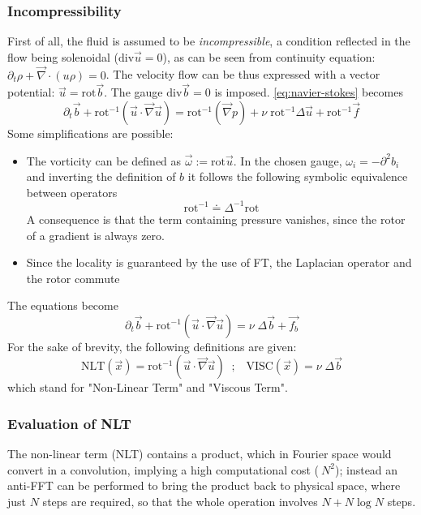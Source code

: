 \subsubsection{Incompressibility}
First of all, the fluid is assumed to be \textit{incompressible}, a condition reflected in the flow being solenoidal (\(\mathrm{div} \vec{u} = 0\)), as can be seen from continuity equation: \(\partial_t \rho + \vec{\nabla} \cdot(u\rho) =0 \).
The velocity flow can be thus expressed with a vector potential: \( \vec{u} = \mathrm{rot} \vec{b} \). The gauge \(\mathrm{div} \vec{b} = 0 \) is imposed. 
\autoref{eq:navier-stokes} becomes
\begin{equation} \label{eq:ns-vecpot-pre}
  \partial_t \vec{b} + \mathrm{rot}^{-1} (\vec{u}\cdot\vec{\nabla}\vec{u}) = \mathrm{rot}^{-1} (\vec{\nabla}p) +\nu\;\mathrm{rot}^{-1}\Delta\vec{u} + \mathrm{rot}^{-1} \vec{f}
\end{equation}
Some simplifications are possible:
\begin{itemize}
  \item The vorticity can be defined as \( \vec{\omega} := \mathrm{rot} \vec{u}\). In the chosen gauge, \( \omega_i = -\partial^2 b_i \) and inverting the definition of $b$ it follows the following symbolic equivalence between operators 
    \[ \mathrm{rot}^{-1} \doteq \Delta^{-1} \mathrm{rot} \]
    A consequence is that the term containing pressure vanishes, since the rotor of a gradient is always zero.
  \item Since the locality is guaranteed by the use of FT, the Laplacian operator and the rotor commute
\end{itemize}
The equations become
\begin{equation} \label{eq:ns-vecpot}
  \partial_t \vec{b} + \mathrm{rot}^{-1} (\vec{u}\cdot\vec{\nabla}\vec{u}) = \nu\;\Delta\vec{b} + \vec{f_b}
\end{equation}
For the sake of brevity, the following definitions are given:
\[ \mathrm{NLT}(\vec{x}) = \mathrm{rot}^{-1}
(\vec{u}\cdot\vec{\nabla}\vec{u}) \;\;;\;\;\; 
\mathrm{VISC}(\vec{x}) = \nu\;\Delta\vec{b} \]
which stand for "Non-Linear Term" and "Viscous Term".

\subsubsection{Evaluation of NLT}
The non-linear term (NLT) contains a product, which in Fourier space would convert in a convolution, implying a high computational cost ($~N^2$); instead an anti-FFT can be performed to bring the product back to physical space, where just $N$ steps are required, so that the whole operation involves \( N + N\log N\) steps.

